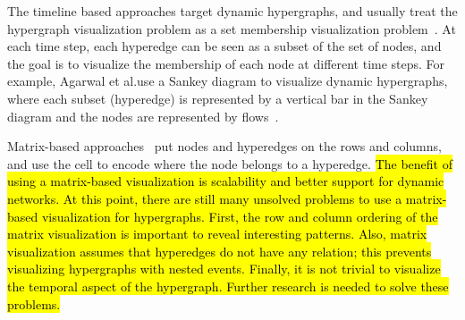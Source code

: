 The timeline based approaches target dynamic hypergraphs, and usually treat the hypergraph visualization problem as a set membership visualization problem~\cite{agarwal2020setstreams, nguyen2016timesets, valdivia2019analyzing}.
At each time step, each hyperedge can be seen as a subset of the set of nodes, and the goal is to visualize the membership of each node at different time steps.
For example, Agarwal et al.use a Sankey diagram to visualize dynamic hypergraphs, where each subset (hyperedge) is represented by a vertical bar in the Sankey diagram and the nodes are represented by flows~\cite{agarwal2020setstreams}.

Matrix-based approaches~\cite{streeb2019visual, fischer2020visual} put nodes and hyperedges on the rows and columns, and use the cell to encode where the node belongs to a hyperedge.
\hl{
The benefit of using a matrix-based visualization is scalability and better support for dynamic networks. 
At this point, there are still many unsolved problems to use a matrix-based visualization for hypergraphs.
First, the row and column ordering of the matrix visualization is important to reveal interesting patterns.
Also, matrix visualization assumes that hyperedges do not have any relation; this prevents visualizing hypergraphs with nested events.
Finally, it is not trivial to visualize the temporal aspect of the hypergraph. 
Further research is needed to solve these problems.
}





